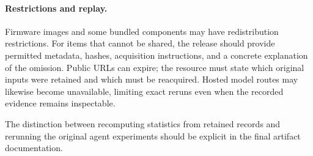 \paragraph{Restrictions and replay.}
Firmware images and some bundled components may have redistribution
restrictions. For items that cannot be shared, the release should provide
permitted metadata, hashes, acquisition instructions, and a concrete
explanation of the omission. Public URLs can expire; the resource must
state which original inputs were retained and which must be reacquired.
Hosted model routes may likewise become unavailable, limiting exact
reruns even when the recorded evidence remains inspectable.

The distinction between recomputing statistics from retained records and
rerunning the original agent experiments should be explicit in the final
artifact documentation.
